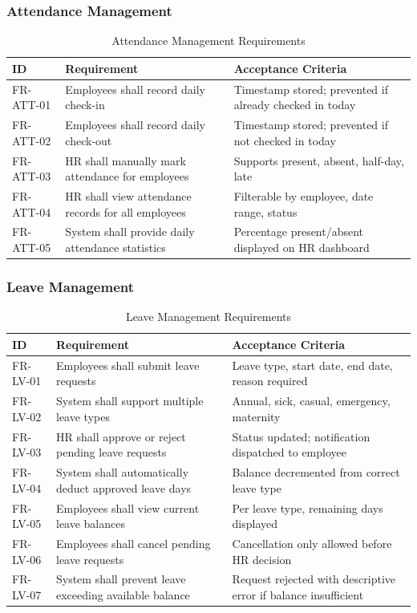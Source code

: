 \documentclass[12pt,a4paper]{report}
\begin{document}
\subsubsection{Attendance Management}

\begin{table}[H]
\centering
\caption{Attendance Management Requirements}
\label{tab:att_req}
\begin{tabular}{|p{2.2cm}|p{5cm}|p{5cm}|}
\hline
\textbf{ID} & \textbf{Requirement} & \textbf{Acceptance Criteria} \\
\hline
FR-ATT-01 & Employees shall record daily check-in & Timestamp stored; prevented if already checked in today \\
\hline
FR-ATT-02 & Employees shall record daily check-out & Timestamp stored; prevented if not checked in today \\
\hline
FR-ATT-03 & HR shall manually mark attendance for employees & Supports present, absent, half-day, late \\
\hline
FR-ATT-04 & HR shall view attendance records for all employees & Filterable by employee, date range, status \\
\hline
FR-ATT-05 & System shall provide daily attendance statistics & Percentage present/absent displayed on HR dashboard \\
\hline
\end{tabular}
\end{table}

\subsubsection{Leave Management}

\begin{table}[H]
\centering
\caption{Leave Management Requirements}
\label{tab:leave_req}
\begin{tabular}{|p{2.2cm}|p{5cm}|p{5cm}|}
\hline
\textbf{ID} & \textbf{Requirement} & \textbf{Acceptance Criteria} \\
\hline
FR-LV-01 & Employees shall submit leave requests & Leave type, start date, end date, reason required \\
\hline
FR-LV-02 & System shall support multiple leave types & Annual, sick, casual, emergency, maternity \\
\hline
FR-LV-03 & HR shall approve or reject pending leave requests & Status updated; notification dispatched to employee \\
\hline
FR-LV-04 & System shall automatically deduct approved leave days & Balance decremented from correct leave type \\
\hline
FR-LV-05 & Employees shall view current leave balances & Per leave type, remaining days displayed \\
\hline
FR-LV-06 & Employees shall cancel pending leave requests & Cancellation only allowed before HR decision \\
\hline
FR-LV-07 & System shall prevent leave exceeding available balance & Request rejected with descriptive error if balance insufficient \\
\hline
\end{tabular}
\end{table}
\end{document}
